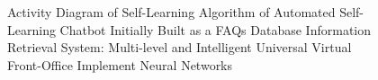 \documentclass[12pt,oneside,openright,a4paper]{cpe-english-project}
\begin{document}
\begin{figure}[h!]
  \centering
  \setlength{\fboxrule}{0.2mm}
  \setlength{\fboxsep}{0.5cm}
  \caption{Activity Diagram of Self-Learning Algorithm of Automated Self-Learning Chatbot
  Initially Built as a FAQs Database Information Retrieval System: Multi-level and Intelligent
  Universal Virtual Front-Office Implement Neural Networks}
  \label{fig:ch3_lr_activity_dg_self_learning_chatbot}
\end{figure}
\end{document}
